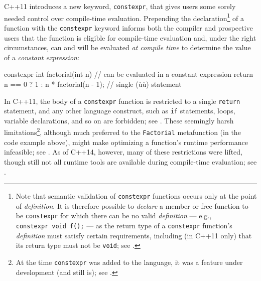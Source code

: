 C++11 introduces a new keyword, \lstinline!constexpr!, that gives users
some sorely needed control over compile-time evaluation. Prepending the
declaration{\cprotect\footnote{Note that semantic validation of
\lstinline!constexpr! functions occurs only at the point of
\emph{definition}. It is therefore possible to \emph{declare} a member
or free function to be \lstinline!constexpr! for which there can be no
valid \emph{definition} --- e.g.,
\lstinline!constexpr!~\lstinline!void!~\lstinline!f();! --- as the return type
of a \lstinline!constexpr! function's \emph{definition} must satisfy
certain requirements, including (in C++11 only) that its return type
must not be \lstinline!void!; see .}} of a function
with the \lstinline!constexpr! keyword informs both the compiler and
prospective users that the function is eligible for compile-time
evaluation and, under the right circumstances, can and will be evaluated
\emph{at compile time} to determine the value of a \emph{constant
expression}:

\begin{emcppslisting}[emcppsbatch=e2]
constexpr int factorial(int n)  // can be evaluated in a constant expression
{
    return n == 0 ? 1 : n * factorial(n - 1);  // single (ù{}ù) statement
}
\end{emcppslisting}


\noindent In C++11, the body of a \lstinline!constexpr! function is restricted to a
single \lstinline!return! statement, and any other language construct, such
as \lstinline!if! statements, loops, variable declarations, and so on are
forbidden; see . These seemingly harsh
limitations{\cprotect\footnote{At the time \lstinline!constexpr! was added
to the language, it was a feature under development (and still is);
  see .}}, although much
preferred to the \lstinline!Factorial! metafunction (in the code example
above), might make optimizing a function's runtime performance
infeasible; see . As of
C++14, however, many of these restrictions were lifted, though still not
all runtime tools are available during compile-time evaluation; see
.

